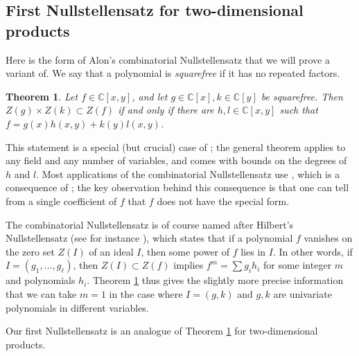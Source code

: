 \documentclass{daj}
\newtheorem{theorem}{Theorem}[section]
\theoremstyle{definition}
\newcommand{\C}{\mathbb C}
\begin{document}
\subsection{First Nullstellensatz for two-dimensional products}

Here is the form of Alon's combinatorial Nullstellensatz that we will prove a variant of.
We say that a polynomial is \emph{squarefree} if it has no repeated factors.


\begin{theorem}\label{thm:alon}
Let $f\in \C[x,y]$, and let $g\in \C[x],k\in\C[y]$ be squarefree.
Then $Z(g)\times Z(k)\subset Z(f)$ if and only if there are $h,l\in \C[x,y]$ such that $f = g(x)h(x,y)+k(y)l(x,y)$.
\end{theorem}

This statement is a special (but crucial) case of \cite[Theorem 1.1]{A}; the general theorem applies to any field and any number of variables, and comes with bounds on the degrees of $h$ and $l$.
Most applications of the combinatorial Nullstellensatz use \cite[Theorem 1.2]{A}, which is a consequence of \cite[Theorem 1.1]{A}; 
the key observation behind this consequence is that one can tell from a single coefficient of $f$ that $f$ does not have the special form.

The combinatorial Nullstellensatz is of course named after Hilbert's Nullstellensatz (see for instance \cite{CLOS, Shaf}), 
which states that if a polynomial $f$ vanishes on the zero set $Z(I)$ of an ideal $I$, 
then some power of $f$ lies in $I$.
In other words, if $I=(g_1,\ldots, g_\ell)$, 
then $Z(I)\subset Z(f)$ implies $f^m = \sum g_ih_i$ for some integer $m$ and polynomials $h_i$.
Theorem \ref{thm:alon} thus gives the slightly more precise information that we can take $m=1$ in the case where $I = (g,k)$ and $g,k$ are univariate polynomials in different variables.

Our first Nullstellensatz is an analogue of Theorem \ref{thm:alon} for two-dimensional products.
\end{document}
